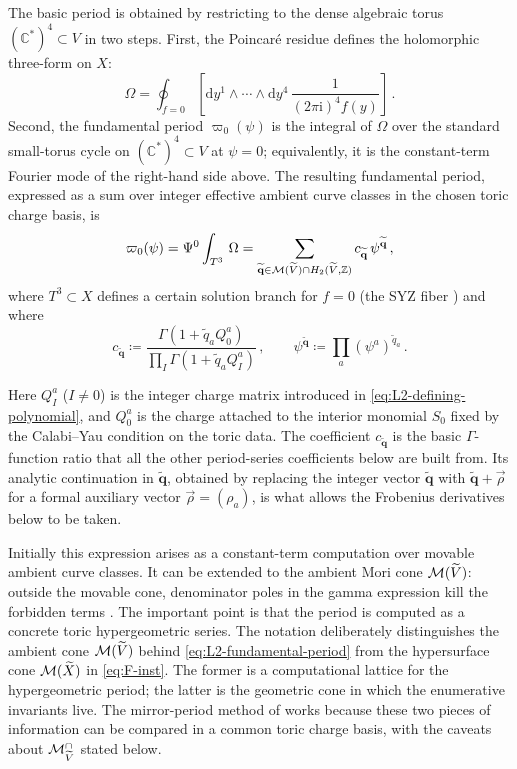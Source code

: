 The basic period is obtained by restricting to the dense algebraic
torus $(\mathbb{C}^*)^4\subset V$ in two steps. First, the
Poincar\'e residue defines the holomorphic three-form on $X$:
\begin{equation}
    \Omega
      =
      \oint_{f=0}\!\left[\mathrm{d}y^1\wedge\cdots\wedge\mathrm{d}y^4
      \,
      \frac{1}{(2\pi\mathrm{i})^4 f(y)}\right]\, .
\end{equation}
Second, the fundamental period $\varpi_0(\psi)$ is the
integral of $\Omega$ over the standard small-torus cycle on
$(\mathbb{C}^*)^4\subset V$ at $\psi=0$; equivalently, it is the
constant-term Fourier mode of the right-hand side above.
The resulting fundamental period, expressed as a sum over integer
effective ambient curve classes in the chosen toric charge basis, is
\begin{equation}\label{eq:L2-fundamental-period}
    \varpi_0(\psi) = \Psi^{0}\int_{T^{3}}\, \Omega
    =
    \sum_{\widetilde{\mathbf q}\in\mathcal{M}(\widetilde V)
          \cap H_2(\widetilde V,\mathbb Z)}
    c_{\widetilde{\mathbf q}}\,
    \psi^{\widetilde{\mathbf q}}\, ,
\end{equation}
where $T^{3}\subset X$ defines a certain solution branch for $f=0$ (the SYZ fiber \cite{Strominger:1996it})
and where
\begin{equation}
c_{\widetilde{\mathbf q}}
    \coloneqq 
    \frac{\Gamma(1+\widetilde q_aQ^a_0)}
         {\prod_I\Gamma(1+\widetilde q_aQ^a_I)}\, ,
    \qquad
    \psi^{\widetilde{\mathbf q}}
    \coloneqq 
    \prod_a(\psi^a)^{\widetilde q_a}\, .
\end{equation}

Here $Q^a_I$ ($I\ne 0$) is the integer charge matrix
introduced in \eqref{eq:L2-defining-polynomial}, and
$Q^a_0$ is the charge attached to the interior monomial $S_0$ fixed
by the Calabi--Yau condition on the toric data.
The coefficient $c_{\widetilde{\mathbf q}}$ is the basic
$\Gamma$-function ratio that all the other period-series coefficients
below are built from.  Its analytic continuation in
$\widetilde{\mathbf q}$, obtained by replacing the integer vector
$\widetilde{\mathbf q}$ with $\widetilde{\mathbf q}+\vec\rho$ for a
formal auxiliary vector $\vec\rho=(\rho_a)$, is what allows the
Frobenius derivatives below to be taken.

Initially this expression arises as a constant-term computation over
movable ambient curve classes.  It can be extended to the ambient
Mori cone $\mathcal{M}(\widetilde V)$: outside the movable cone, denominator
poles in the gamma expression kill the forbidden terms
\cite{Demirtas:2023als}.  The important point is that the period is
computed as a concrete toric hypergeometric series.
The notation deliberately distinguishes the ambient cone
$\mathcal{M}(\widetilde V)$ behind \eqref{eq:L2-fundamental-period} from the
hypersurface cone $\mathcal{M}(\widetilde X)$ in \eqref{eq:F-inst}. The
former is a computational lattice for the hypergeometric period; the
latter is the geometric cone in which the enumerative invariants
live. The mirror-period method of \cite{Demirtas:2023als} works
because these two pieces of information can be compared in a common
toric charge basis, with the caveats about $\mathcal{M}_{\widetilde V}^{\cap}$
stated below.


